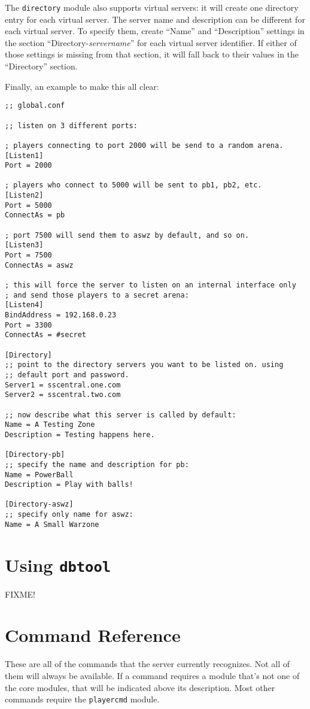 \documentclass{article}
\begin{document}
The \verb/directory/ module also supports virtual servers: it will
create one directory entry for each virtual server. The server name and
description can be different for each virtual server. To specify them,
create ``Name'' and ``Description'' settings in the section
``Directory-\emph{servername}'' for each virtual server identifier. If
either of those settings is missing from that section, it will fall back
to their values in the ``Directory'' section.

Finally, an example to make this all clear:

\begin{verbatim}
;; global.conf

;; listen on 3 different ports:

; players connecting to port 2000 will be send to a random arena.
[Listen1]
Port = 2000

; players who connect to 5000 will be sent to pb1, pb2, etc.
[Listen2]
Port = 5000
ConnectAs = pb

; port 7500 will send them to aswz by default, and so on.
[Listen3]
Port = 7500
ConnectAs = aswz

; this will force the server to listen on an internal interface only
; and send those players to a secret arena:
[Listen4]
BindAddress = 192.168.0.23
Port = 3300
ConnectAs = #secret

[Directory]
;; point to the directory servers you want to be listed on. using
;; default port and password.
Server1 = sscentral.one.com
Server2 = sscentral.two.com

;; now describe what this server is called by default:
Name = A Testing Zone
Description = Testing happens here.

[Directory-pb]
;; specify the name and description for pb:
Name = PowerBall
Description = Play with balls!

[Directory-aswz]
;; specify only name for aswz:
Name = A Small Warzone
\end{verbatim}


\section{Using \texttt{dbtool}}

FIXME!


\section{Command Reference}

These are all of the commands that the server currently recognizes. Not
all of them will always be available. If a command requires a module
that's not one of the core modules, that will be indicated above its
description. Most other commands require the \texttt{playercmd} module.
\end{document}
